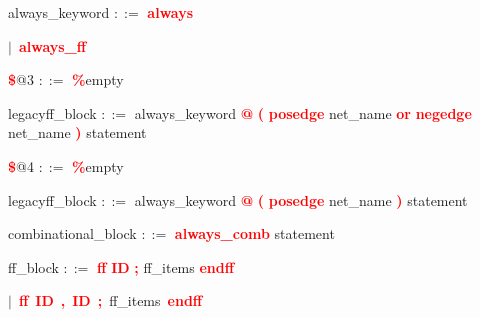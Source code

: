 \vspace{1em}
\noindent
\settowidth{\parindent}{\hspace{4ex}}
always\_keyword $::=$\hspace{1ex} \textbf{\textcolor{red}{always}}

\mbox{$|$ \textbf{\textcolor{red}{always\_ff}}}

\vspace{1em}
\noindent
\settowidth{\parindent}{\hspace{4ex}}
\textbf{\textcolor{red}{\$}}@3 $::=$\hspace{1ex} \textbf{\textcolor{red}{\%}}empty

\vspace{1em}
\noindent
\settowidth{\parindent}{\hspace{4ex}}
legacyff\_block $::=$\hspace{1ex} always\_keyword \textbf{\textcolor{red}{@}} \textbf{\textcolor{red}{(}} \textbf{\textcolor{red}{posedge}} net\_name \textbf{\textcolor{red}{or}} \textbf{\textcolor{red}{negedge}} net\_name \textbf{\textcolor{red}{)}} statement

\vspace{1em}
\noindent
\settowidth{\parindent}{\hspace{4ex}}
\textbf{\textcolor{red}{\$}}@4 $::=$\hspace{1ex} \textbf{\textcolor{red}{\%}}empty

\vspace{1em}
\noindent
\settowidth{\parindent}{\hspace{4ex}}
legacyff\_block $::=$\hspace{1ex} always\_keyword \textbf{\textcolor{red}{@}} \textbf{\textcolor{red}{(}} \textbf{\textcolor{red}{posedge}} net\_name \textbf{\textcolor{red}{)}} statement

\vspace{1em}
\noindent
\settowidth{\parindent}{\hspace{4ex}}
combinational\_block $::=$\hspace{1ex} \textbf{\textcolor{red}{always\_comb}} statement

\vspace{1em}
\noindent
\settowidth{\parindent}{\hspace{4ex}}
ff\_block $::=$\hspace{1ex} \textbf{\textcolor{red}{ff}} \textbf{\textcolor{red}{ID}} \textbf{\textcolor{red}{;}} ff\_items \textbf{\textcolor{red}{endff}}

\mbox{$|$ \textbf{\textcolor{red}{ff}} \textbf{\textcolor{red}{ID}} \textbf{\textcolor{red}{,}} \textbf{\textcolor{red}{ID}} \textbf{\textcolor{red}{;}} ff\_items \textbf{\textcolor{red}{endff}}}

